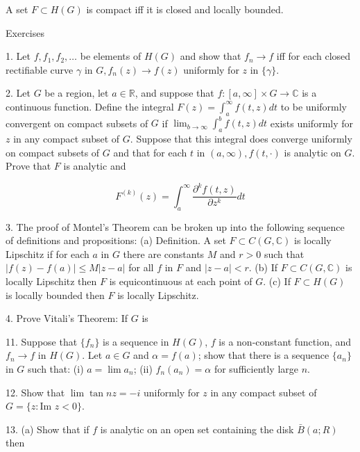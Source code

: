 A set $F \subset H(G)$ is compact iff it is closed and locally bounded.

Exercises

1. Let $f, f_1, f_2, \ldots$ be elements of $H(G)$ and show that $f_n \rightarrow f$ iff for each closed rectifiable curve $\gamma$ in $G, f_n(z) \rightarrow f(z)$ uniformly for $z$ in $\{\gamma\}$.

2. Let $G$ be a region, let $a \in \mathbb{R}$, and suppose that $f: [a, \infty] \times G \rightarrow \mathbb{C}$ is a continuous function. Define the integral $F(z) = \int_a^\infty f(t, z)dt$ to be uniformly convergent on compact subsets of $G$ if $\lim_{b \to \infty} \int_a^b f(t, z)dt$ exists uniformly for $z$ in any compact subset of $G$. Suppose that this integral does converge uniformly on compact subsets of $G$ and that for each $t$ in $(a, \infty), f(t, \cdot)$ is analytic on $G$. Prove that $F$ is analytic and

$$F^{(k)}(z) = \int_a^\infty \frac{\partial^k f(t, z)}{\partial z^k} dt$$

3. The proof of Montel’s Theorem can be broken up into the following sequence of definitions and propositions: (a) Definition. A set $F \subset C(G, \mathbb{C})$ is locally Lipschitz if for each $a$ in $G$ there are constants $M$ and $r > 0$ such that $|f(z) - f(a)| \leq M|z - a|$ for all $f$ in $F$ and $|z - a| < r$. (b) If $F \subset C(G, \mathbb{C})$ is locally Lipschitz then $F$ is equicontinuous at each point of $G$. (c) If $F \subset H(G)$ is locally bounded then $F$ is locally Lipschitz.

4. Prove Vitali’s Theorem: If $G$ is

11. Suppose that $\{f_n\}$ is a sequence in $H(G)$, $f$ is a non-constant function, and $f_n \rightarrow f$ in $H(G)$. Let $a \in G$ and $\alpha = f(a)$; show that there is a sequence $\{a_n\}$ in $G$ such that: (i) $a = \lim a_n$; (ii) $f_n(a_n) = \alpha$ for sufficiently large $n$.

12. Show that $\lim \tan nz = -i$ uniformly for $z$ in any compact subset of $G = \{z: \text{Im } z < 0\}$.

13. (a) Show that if $f$ is analytic on an open set containing the disk $\bar{B}(a; R)$ then